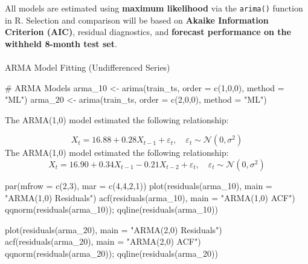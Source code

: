 \documentclass[
  11pt,
]{article}
\makeatletter
\let\oldparagraph\paragraph
\renewcommand{\paragraph}{
    \@ifstar
      \xxxParagraphStar
      \xxxParagraphNoStar
  }
\newcommand{\xxxParagraphStar}[1]{\oldparagraph*{#1}\mbox{}}
\newcommand{\xxxParagraphNoStar}[1]{\oldparagraph{#1}\mbox{}}
\newenvironment{Shaded}{\begin{snugshade}}{\end{snugshade}}
\newcommand{\AttributeTok}[1]{\textcolor[rgb]{0.40,0.45,0.13}{#1}}
\newcommand{\CommentTok}[1]{\textcolor[rgb]{0.37,0.37,0.37}{#1}}
\newcommand{\DecValTok}[1]{\textcolor[rgb]{0.68,0.00,0.00}{#1}}
\newcommand{\FunctionTok}[1]{\textcolor[rgb]{0.28,0.35,0.67}{#1}}
\newcommand{\NormalTok}[1]{\textcolor[rgb]{0.00,0.23,0.31}{#1}}
\newcommand{\OtherTok}[1]{\textcolor[rgb]{0.00,0.23,0.31}{#1}}
\newcommand{\StringTok}[1]{\textcolor[rgb]{0.13,0.47,0.30}{#1}}
\makeatother
\begin{document}
All models are estimated using \textbf{maximum likelihood} via the
\texttt{arima()} function in R. Selection and comparison will be based
on \textbf{Akaike Information Criterion (AIC)}, residual diagnostics,
and \textbf{forecast performance on the withheld 8-month test set}.

\paragraph{ARMA Model Fitting (Undifferenced
Series)}\label{arma-model-fitting-undifferenced-series}

\begin{Shaded}
\begin{Highlighting}[]
\CommentTok{\# ARMA Models}
\NormalTok{arma\_10 }\OtherTok{\textless{}{-}} \FunctionTok{arima}\NormalTok{(train\_ts, }\AttributeTok{order =} \FunctionTok{c}\NormalTok{(}\DecValTok{1}\NormalTok{,}\DecValTok{0}\NormalTok{,}\DecValTok{0}\NormalTok{), }\AttributeTok{method =} \StringTok{"ML"}\NormalTok{)}
\NormalTok{arma\_20 }\OtherTok{\textless{}{-}} \FunctionTok{arima}\NormalTok{(train\_ts, }\AttributeTok{order =} \FunctionTok{c}\NormalTok{(}\DecValTok{2}\NormalTok{,}\DecValTok{0}\NormalTok{,}\DecValTok{0}\NormalTok{), }\AttributeTok{method =} \StringTok{"ML"}\NormalTok{)}
\end{Highlighting}
\end{Shaded}

The ARMA(1,0) model estimated the following relationship:

\[
X_t = 16.88 + 0.28 X_{t-1} + \varepsilon_t, \quad \varepsilon_t \sim \mathcal{N}(0, \sigma^2)
\] The ARMA(1,0) model estimated the following relationship: \[
X_t = 16.90 + 0.34 X_{t-1} - 0.21 X_{t-2} + \varepsilon_t, \quad \varepsilon_t \sim \mathcal{N}(0, \sigma^2)
\]

\begin{Shaded}
\begin{Highlighting}[]
\FunctionTok{par}\NormalTok{(}\AttributeTok{mfrow =} \FunctionTok{c}\NormalTok{(}\DecValTok{2}\NormalTok{,}\DecValTok{3}\NormalTok{), }\AttributeTok{mar =} \FunctionTok{c}\NormalTok{(}\DecValTok{4}\NormalTok{,}\DecValTok{4}\NormalTok{,}\DecValTok{2}\NormalTok{,}\DecValTok{1}\NormalTok{))}
\FunctionTok{plot}\NormalTok{(}\FunctionTok{residuals}\NormalTok{(arma\_10), }\AttributeTok{main =} \StringTok{"ARMA(1,0) Residuals"}\NormalTok{)}
\FunctionTok{acf}\NormalTok{(}\FunctionTok{residuals}\NormalTok{(arma\_10), }\AttributeTok{main =} \StringTok{"ARMA(1,0) ACF"}\NormalTok{)}
\FunctionTok{qqnorm}\NormalTok{(}\FunctionTok{residuals}\NormalTok{(arma\_10)); }\FunctionTok{qqline}\NormalTok{(}\FunctionTok{residuals}\NormalTok{(arma\_10))}

\FunctionTok{plot}\NormalTok{(}\FunctionTok{residuals}\NormalTok{(arma\_20), }\AttributeTok{main =} \StringTok{"ARMA(2,0) Residuals"}\NormalTok{)}
\FunctionTok{acf}\NormalTok{(}\FunctionTok{residuals}\NormalTok{(arma\_20), }\AttributeTok{main =} \StringTok{"ARMA(2,0) ACF"}\NormalTok{)}
\FunctionTok{qqnorm}\NormalTok{(}\FunctionTok{residuals}\NormalTok{(arma\_20)); }\FunctionTok{qqline}\NormalTok{(}\FunctionTok{residuals}\NormalTok{(arma\_20))}
\end{Highlighting}
\end{Shaded}
\end{document}
